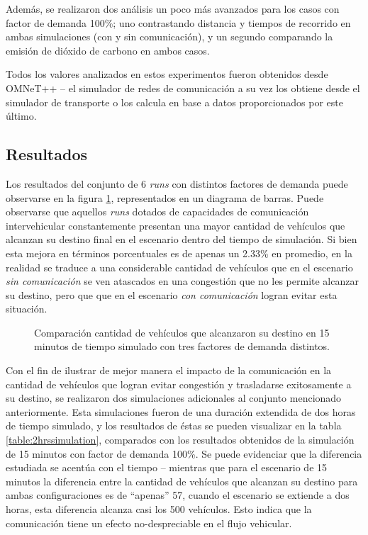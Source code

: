 Además, se realizaron dos análisis un poco más avanzados para los casos con factor de demanda 100\%; uno contrastando distancia y tiempos de recorrido en ambas simulaciones (con y sin comunicación), y un segundo comparando la emisión de dióxido de carbono en ambos casos. 

Todos los valores analizados en estos experimentos fueron obtenidos desde OMNeT++ -- el simulador de redes de comunicación a su vez los obtiene desde el simulador de transporte o los calcula en base a datos proporcionados por este último. 

\subsection{Resultados}

Los resultados del conjunto de 6 \emph{runs} con distintos factores de demanda puede observarse en la figura \ref{fig:arrivedcomp}, representados en un diagrama de barras. Puede observarse que aquellos \emph{runs} dotados de capacidades de comunicación intervehicular constantemente presentan una mayor cantidad de vehículos que alcanzan su destino final en el escenario dentro del tiempo de simulación. Si bien esta mejora en términos porcentuales es de apenas un 2.33\% en promedio, en la realidad se traduce a una considerable cantidad de vehículos que en el escenario \emph{sin comunicación} se ven atascados en una congestión que no les permite alcanzar su destino, pero que que en el escenario \emph{con comunicación} logran evitar esta situación.

\begin{figure}[tpb]
    \centering
    
    \caption[Comparación cantidad de vehículos que alcanzaron su destino]{Comparación cantidad de vehículos que alcanzaron su destino en 15 minutos de tiempo simulado con tres factores de demanda distintos.}
    \label{fig:arrivedcomp}
\end{figure}

Con el fin de ilustrar de mejor manera el impacto de la comunicación en la cantidad de vehículos que logran evitar congestión y trasladarse exitosamente a su destino, se realizaron dos simulaciones adicionales al conjunto mencionado anteriormente. Esta simulaciones fueron de una duración extendida de dos horas de tiempo simulado, y los resultados de éstas se pueden visualizar en la tabla \ref{table:2hrssimulation}, comparados con los resultados obtenidos de la simulación de 15 minutos con factor de demanda 100\%. Se puede evidenciar que la diferencia estudiada se acentúa con el tiempo -- mientras que para el escenario de 15 minutos la diferencia entre la cantidad de vehículos que alcanzan su destino para ambas configuraciones es de ``apenas'' 57, cuando el escenario se extiende a dos horas, esta diferencia alcanza casi los 500 vehículos. Esto indica que la comunicación tiene un efecto no-despreciable en el flujo vehicular.

